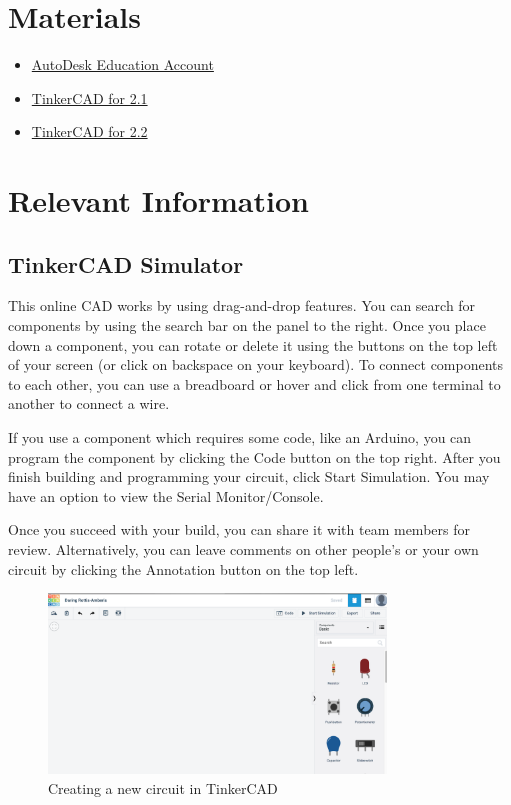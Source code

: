 \documentclass{article}
\begin{document}
\section{Materials}
\begin{itemize}
	\item \href{https://www.autodesk.com/education/edu-software/overview}{AutoDesk Education Account}
	\item \href{https://www.tinkercad.com/things/l61Qq635TAR}{TinkerCAD for 2.1}
	\item \href{https://www.tinkercad.com/things/60Ol9dbc90P}{TinkerCAD for 2.2}
\end{itemize}

\section{Relevant Information}
\subsection{TinkerCAD Simulator}
This online CAD works by using drag-and-drop features. You can search for components by using the search bar on the panel to the right. Once you place down a component, you can rotate or delete it using the buttons on the top left of your screen (or click on backspace on your keyboard). To connect components to each other, you can use a breadboard or hover and click from one terminal to another to connect a wire.

If you use a component which requires some code, like an Arduino, you can program the component by clicking the Code button on the top right. After you finish building and programming your circuit, click Start Simulation. You may have an option to view the Serial Monitor/Console. 

Once you succeed with your build, you can share it with team members for review. Alternatively, you can leave comments on other people’s or your own circuit by clicking the Annotation button on the top left. 
\begin{figure}[ht]
	\center
	\includegraphics[width=0.8\textwidth, keepaspectratio]{images/tinkercadwindow.png}
	\caption{Creating a new circuit in TinkerCAD}
	\label{fig:window}
\end{figure}
\end{document}
